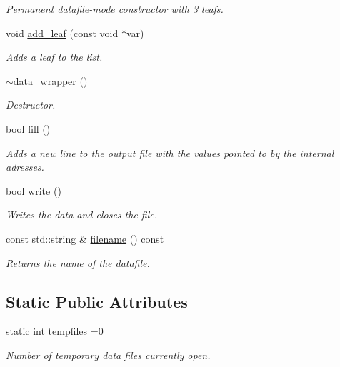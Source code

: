 \begin{DoxyCompactItemize}
\begin{DoxyCompactList}\small\item\em Permanent datafile-\/mode constructor with 3 leafs. \end{DoxyCompactList}\item 
\hypertarget{a00116_a6bb7c7096f4de9dfdc94be87905030ea}{}void \hyperlink{a00116_a6bb7c7096f4de9dfdc94be87905030ea}{add\+\_\+leaf} (const void $\ast$var)\label{a00116_a6bb7c7096f4de9dfdc94be87905030ea}

\begin{DoxyCompactList}\small\item\em Adds a leaf to the list. \end{DoxyCompactList}\item 
\hyperlink{a00116_a70646ebd26014836e10ff3784ad02242}{$\sim$data\+\_\+wrapper} ()
\begin{DoxyCompactList}\small\item\em Destructor. \end{DoxyCompactList}\item 
bool \hyperlink{a00116_a6217a30f13b132cc08a9ee95d69d0257}{fill} ()
\begin{DoxyCompactList}\small\item\em Adds a new line to the output file with the values pointed to by the internal adresses. \end{DoxyCompactList}\item 
\hypertarget{a00116_af244d017966e0f501e50fb128c70802b}{}bool \hyperlink{a00116_af244d017966e0f501e50fb128c70802b}{write} ()\label{a00116_af244d017966e0f501e50fb128c70802b}

\begin{DoxyCompactList}\small\item\em Writes the data and closes the file. \end{DoxyCompactList}\item 
\hypertarget{a00116_a58d39a55d0c474cf39c3bac05709baab}{}const std\+::string \& \hyperlink{a00116_a58d39a55d0c474cf39c3bac05709baab}{filename} () const \label{a00116_a58d39a55d0c474cf39c3bac05709baab}

\begin{DoxyCompactList}\small\item\em Returns the name of the datafile. \end{DoxyCompactList}\end{DoxyCompactItemize}
\subsection*{Static Public Attributes}
\begin{DoxyCompactItemize}
\item 
\hypertarget{a00116_a2fe73dd80dc53dad660853b7d787d94e}{}static int \hyperlink{a00116_a2fe73dd80dc53dad660853b7d787d94e}{tempfiles} =0\label{a00116_a2fe73dd80dc53dad660853b7d787d94e}

\begin{DoxyCompactList}\small\item\em Number of temporary data files currently open. \end{DoxyCompactList}\end{DoxyCompactItemize}


